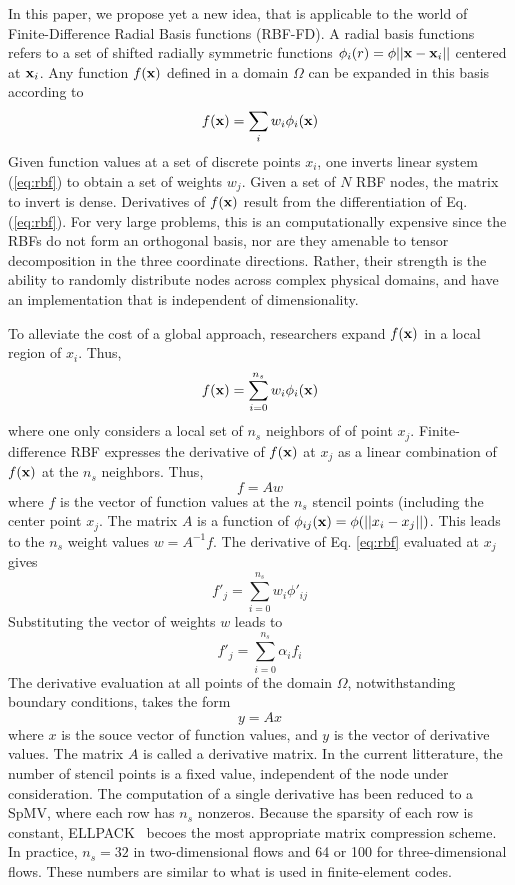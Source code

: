 \documentclass[10pt,conference,compsocconf]{IEEEtran}
\begin{document}

In this paper, we propose yet a new idea, that is applicable to the
world of Finite-Difference Radial Basis functions (RBF-FD). A radial
basis functions refers to a set of shifted radially symmetric
functions $\phi_i(r) =\phi{||{\bf x}-{\bf x}_i||}$ centered at
${\bf x}_i$\cite{}. Any function $f({\bf x})$ defined in a domain $\Omega$
can be expanded in this basis according to
\begin{equation}
f(\xvec) =  \sum_i w_i \phi_i(\xvec) \label{eq:rbf}
\end{equation}
Given function values at a set of discrete points $x_i$, one inverts
linear system (\ref{eq:rbf}) to obtain a set of weights $w_j$. Given a
set of $N$ RBF nodes, the matrix to invert is dense. Derivatives of
$f({\bf x})$ result from the differentiation of Eq. (\ref{eq:rbf}). For
very large problems, this is an computationally expensive since the
RBFs do not form an orthogonal basis, nor are they amenable to tensor
decomposition in the three coordinate directions. Rather, their
strength is the ability to randomly distribute nodes across complex
physical domains, and have an implementation that is independent of
dimensionality.

To alleviate the cost of a global approach, researchers \cite{} expand
$f({\bf x})$ in a local region of $x_i$. Thus,
$$
f(\xvec) =  \sum_{i=0}^{n_s} w_i \phi_i(\xvec) \label{eq:rbf}
$$
where one only considers a local set of $n_s$ neighbors of of point $x_j$. 
Finite-difference RBF expresses the derivative of $f({\bf x})$ at $x_j$ as a linear
combination of $f({\bf x})$ at the $n_s$ neighbors. Thus, 
$$
f = A w
$$ where $f$ is the vector of function values at the $n_s$ stencil
points (including the center point $x_j$. The matrix $A$ is a function
of $\phi_{ij}({\bf x}) =\phi(||x_i-x_j||)$. This leads to the $n_s$
weight values $w = A^{-1} f$. The derivative of Eq. \ref{eq:rbf}
evaluated at $x_j$ gives
$$
   f'_j = \sum_{i=0}^{n_s} w_i \phi'_{ij}
$$
Substituting the vector of weights $w$ leads to 
$$
  f'_j = \sum_{i=0}^{n_s} \alpha_i f_i
$$
The derivative evaluation at all points of the domain $\Omega$, notwithstanding boundary conditions, takes the form
$$
  y = A x
$$ 
where $x$ is the souce vector of function values, and $y$ is the
vector of derivative values. The matrix $A$ is called a derivative
matrix. In the current litterature, the number of stencil points is a
fixed value, independent of the node under consideration\cite{}. The
computation of a single derivative has been reduced to a SpMV, where
each row has $n_s$ nonzeros. Because the sparsity of each row is
constant, ELLPACK~\cite{} becoes the most appropriate matrix
compression scheme\cite{}. In practice, $n_s=32$ in two-dimensional
flows and 64 or 100 for three-dimensional flows. These numbers are
similar to what is used in finite-element codes.
\end{document}
